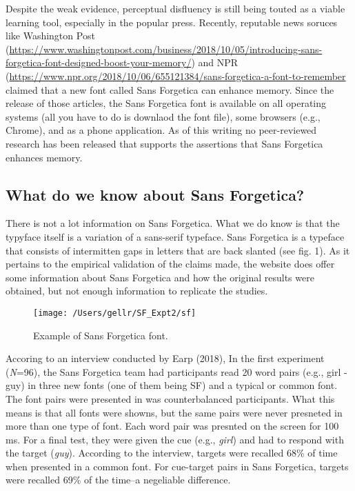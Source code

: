 \documentclass[doc]{apa6}
\begin{document}
Despite the weak evidence, perceptual disfluency is still being touted as a viable learning tool, especially in the popular press. Recently, reputable news soruces like Washington Post (\url{https://www.washingtonpost.com/business/2018/10/05/introducing-sans-forgetica-font-designed-boost-your-memory/}) and NPR (\url{https://www.npr.org/2018/10/06/655121384/sans-forgetica-a-font-to-remember} claimed that a new font called Sans Forgetica can enhance memory. Since the release of those articles, the Sans Forgetica font is available on all operating systems (all you have to do is downlaod the font file), some browsers (e.g., Chrome), and as a phone application. As of this writing no peer-reviewed research has been released that supports the assertions that Sans Forgetica enhances memory.

\hypertarget{what-do-we-know-about-sans-forgetica}{%
\subsection{What do we know about Sans Forgetica?}\label{what-do-we-know-about-sans-forgetica}}

There is not a lot information on Sans Forgetica. What we do know is that the typyface itself is a variation of a sans-serif typeface. Sans Forgetica is a typeface that consists of intermitten gaps in letters that are back slanted (see fig. 1). As it pertains to the empirical validation of the claims made, the website does offer some information about Sans Forgetica and how the original results were obtained, but not enough information to replicate the studies.

\begin{figure}
\texttt{[image: /Users/gellr/SF\_Expt2/sf]} \caption{Example of Sans Forgetica font. }\label{fig:unnamed-chunk-1}
\end{figure}

Accoring to an interview conducted by Earp (2018), In the first experiment (\emph{N}=96), the Sans Forgetica team had participants read 20 word pairs (e.g., girl - guy) in three new fonts (one of them being SF) and a typical or common font. The font pairs were presented in was counterbalanced participants. What this means is that all fonts were showns, but the same pairs were never presneted in more than one type of font. Each word pair was presnted on the screen for 100 ms. For a final test, they were given the cue (e.g., \emph{girl}) and had to respond with the target (\emph{guy}). According to the interview, targets were recalled 68\% of time when presented in a common font. For cue-target pairs in Sans Forgetica, targets were recalled 69\% of the time--a negeliable difference.
\end{document}
